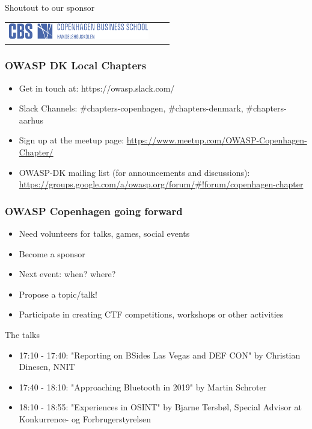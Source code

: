 \documentclass[aspectratio=169,xcolor={dvipsnames}]{beamer}
\begin{document}
\begin{frame}
  {Shoutout to our sponsor}
  \begin{center}
    \begin{tabular}{ccc}
      \includegraphics[valign=m,width=.7\textwidth]{CBSlogo.pdf}
    \end{tabular}
  \end{center}
\end{frame}

\begin{frame}
  \frametitle{OWASP DK Local Chapters}
  \begin{itemize}
  \item Get in touch at: https://owasp.slack.com/\vfill

  \item Slack Channels: \#chapters-copenhagen, \#chapters-denmark, \#chapters-aarhus\vfill


  \item Sign up at the meetup page: \url{https://www.meetup.com/OWASP-Copenhagen-Chapter/}\vfill

  \item OWASP-DK mailing list (for announcements and discussions): \url{https://groups.google.com/a/owasp.org/forum/#!forum/copenhagen-chapter}

  \end{itemize}
\end{frame}

\begin{frame}
  \frametitle{OWASP Copenhagen going forward}

  \begin{itemize}
    \item Need volunteers for talks, games, social events
    \item Become a sponsor
    \item Next event: when? where?
    \item Propose a topic/talk!
    \item Participate in creating CTF competitions, workshops or other activities
  \end{itemize}
\end{frame}

\begin{frame}
  {The talks}

  \begin{itemize}
  \item 17:10 - 17:40: "Reporting on BSides Las Vegas and DEF CON" by Christian Dinesen, NNIT
  \item 17:40 - 18:10: "Approaching Bluetooth in 2019" by Martin Schroter
  \item 18:10 - 18:55: "Experiences in OSINT" by Bjarne Tersbøl, Special Advisor at Konkurrence- og Forbrugerstyrelsen
  \end{itemize}

  
\end{frame}
\end{document}
